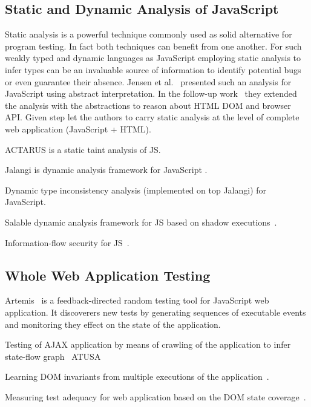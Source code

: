\documentclass[sigconf]{acmart}
\begin{document}
\subsection{Static and Dynamic Analysis of JavaScript}
\label{sub.sec.js.static.anal}

Static analysis is a powerful technique commonly used as solid alternative for program testing. In fact both techniques can benefit from one another. For such weakly typed and dynamic languages as JavaScript employing static analysis to infer types can be an invaluable source of information to identify potential bugs or even guarantee their absence. Jensen et al.~\cite{tajs2009} presented such an analysis for JavaScript using abstract interpretation. In the follow-up work~\cite{dom2011} they extended the analysis with the abstractions to reason about HTML DOM and browser API. Given step let the authors to carry static analysis at the level of complete web application (JavaScript + HTML).
\cite{jquery2014}


ACTARUS is a static taint analysis of JS\cite{guarnieri2011saving}.

Jalangi is dynamic analysis framework for JavaScript \cite{sen2013jalangi}.

Dynamic type inconsistency analysis (implemented on top Jalangi) for JavaScript\cite{pradel2015typedevil}.

Salable dynamic analysis framework for JS based on shadow executions~\cite{create.citation}.

Information-flow security for JS~\cite{hedin2012information}.

\subsection{Whole Web Application Testing}
\label{sub.sec.web.app.test}

Artemis~\cite{artemis2011} is a feedback-directed random testing tool for JavaScript web application. It discoverers new tests by generating sequences of executable events and monitoring they effect on the state of the application. \cite{ail2013}

Testing of AJAX application by means of crawling of the application to infer state-flow graph~\cite{mesbah2012crawling} ATUSA ~\cite{mesbah2012invariant}

Learning DOM invariants from multiple executions of the application~\cite{pattabiraman2010dodom}.

Measuring test adequacy for web application based on the DOM state coverage~\cite{mirzaaghaei2014dom}.
\end{document}
